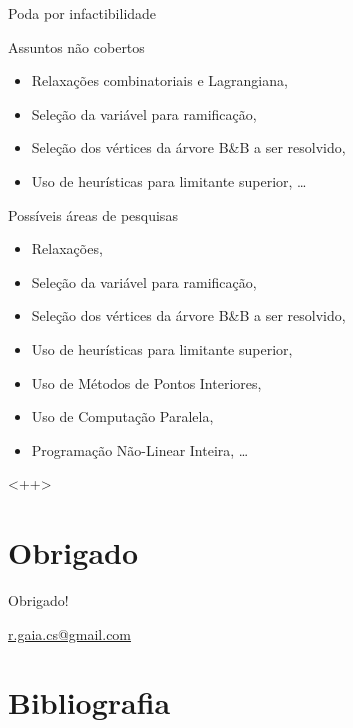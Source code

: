 \documentclass[11pt]{beamer}
\newcommand{\nodebounds}[3]{\begin{tabular}{|c|c|c|} \hline
  \multirow{2}{*}{$#1$} & $\overline{z}$ & $#2$ \\ \cline{2-3}
  & $\underline{z}$ &  $#3$ \\ \hline
 \end{tabular}}
\begin{document}
\begin{frame}{Poda por infactibilidade}
  \begin{center}
  \end{center}
\end{frame}

\begin{frame}{Assuntos não cobertos}
  \begin{itemize}
    \item Relaxações combinatoriais e Lagrangiana,
    \item Seleção da variável para ramificação,
    \item Seleção dos vértices da árvore B\&B a ser resolvido,
    \item Uso de heurísticas para limitante superior, \ldots
  \end{itemize}
\end{frame}

\begin{frame}{Possíveis áreas de pesquisas}
  \begin{itemize}
    \item Relaxações,
    \item Seleção da variável para ramificação,
    \item Seleção dos vértices da árvore B\&B a ser resolvido,
    \item Uso de heurísticas para limitante superior,
    \item Uso de Métodos de Pontos Interiores,
    \item Uso de Computação Paralela,
    \item Programação Não-Linear Inteira, \ldots
  \end{itemize}
\end{frame}<++>
\section*{Obrigado}
\begin{frame}
  \begin{center}
    Obrigado!
  \end{center}
  \begin{center}
    \url{r.gaia.cs@gmail.com}
  \end{center}
\end{frame}

\section*{Bibliografia}
\begin{frame}
  \nocite{wolsey1998integer}
  
  
\end{frame}
\end{document}
